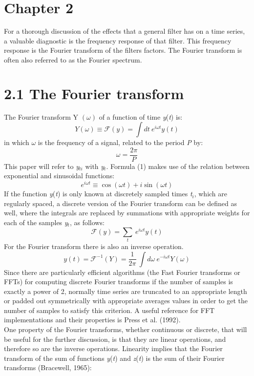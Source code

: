 \documentclass{article}
\begin{document}
\def\mathbi#1{\textbf{\em #1}}
\section*{Chapter 2}
For a thorough discussion of the effects that a general filter has on a time series, a valuable diagnostic is the frequency response of that filter. This frequency response is the Fourier transform of the filters factors. The Fourier transform is often also referred to as the Fourier spectrum.
\section*{\small 2.1 The Fourier transform}
The Fourier transform Y $(\omega)$ of a function of time \textit{y}(\textit{t}) is:
\begin{equation}
Y (\omega)\equiv \mathcal{F} (\textit{y})= \int dt \ e^{i \omega t} y(\textit{t})
\end{equation}
in which $\omega$ is the frequency of a signal, related to the period \textit{P} by:
\begin{equation}
\omega = \frac {2\pi}{P}
\end{equation}
This paper will refer to \textit{y$_{ti}$} with \textit{y$_t$}. Formula (1) makes use of the relation between exponential and sinusoidal functions:
\begin{equation}
e^{i \omega t} \equiv \cos(\omega t) + i \sin(\omega t)
\end{equation}
If the function \textit{y}(\textit{t}) is only known at discretely sampled times \textit{t$_i$}, which are regularly spaced, a discrete version of the Fourier transform can be defined as well, where the integrals are replaced by summations with appropriate weights for each of the samples \textit{y$_t$}, as follows:
\begin{equation}
\mathcal{F}(y) = \sum_t  \ e^{i \omega t} y(\textit{t})
\end{equation}
For the Fourier transform there is also an inverse operation.
\begin{equation}
y(\textit{t}) = \mathcal{F}^{-1} (Y) = \frac {1}{2 \pi} \ \int d\omega \ e^{-i \omega t} Y(\omega)
\end{equation}
Since there are particularly efficient algorithms (the Fast Fourier transforms or FFTs) for computing discrete Fourier transforms if the number of samples is exactly a power of 2, normally time series are truncated to an appropriate length or padded out symmetrically with appropriate averages values in order to get the number of samples to satisfy this criterion. A useful reference for FFT implementations and their properties is Press et al. (1992).\\One property of the Fourier transforms, whether continuous or discrete, that will be useful for the further discussion, is that they are linear operations, and therefore so are the inverse operations. Linearity implies that the Fourier transform of the sum of functions \textit{y}(\textit{t}) and \textit{z}(\textit{t}) is the sum of their Fourier transforms (Bracewell, 1965):
\end{document}
